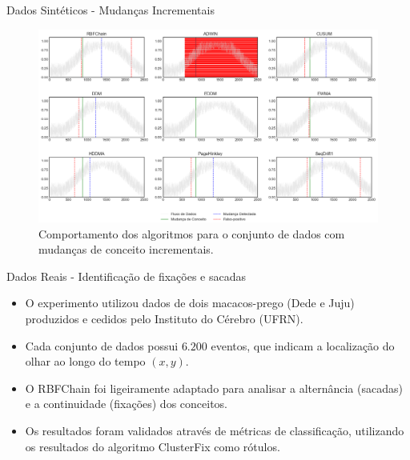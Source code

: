 \documentclass[10pt]{beamer}
\begin{document}
\begin{frame}{Dados Sintéticos -  Mudanças Incrementais}
    \begin{figure}[t]
        \begin{center}
            \includegraphics[width=\textwidth]{imagens/incremental.png}
            \caption{Comportamento dos algoritmos para o conjunto de dados com mudanças de conceito incrementais.}
            \label{fig:exp_incremental}
        \end{center}
    \end{figure}
\end{frame}

\begin{frame}{Dados Reais - Identificação de fixações e sacadas}
    \begin{itemize}
        \item O experimento utilizou dados de dois macacos-prego (Dede e Juju) produzidos e cedidos pelo Instituto do Cérebro (UFRN).
        \item Cada conjunto de dados possui $6.200$ eventos, que indicam a localização do olhar ao longo do tempo $(x, y)$.
        \item O RBFChain foi ligeiramente adaptado para analisar a alternância (sacadas) e a continuidade (fixações) dos conceitos.
        \item Os resultados foram validados através de métricas de classificação, utilizando os resultados do algoritmo ClusterFix \cite{KONIG2014121} como rótulos.
    \end{itemize}
\end{frame}
\end{document}
